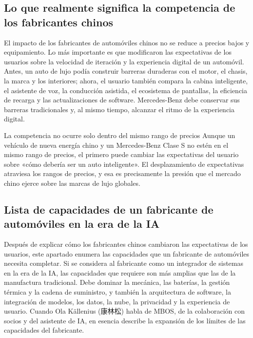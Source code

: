 \documentclass[a4paper]{article}
\begin{document}
\subsection{Lo que realmente significa la competencia de los fabricantes chinos}

El impacto de los fabricantes de automóviles chinos no se reduce a precios bajos y equipamiento. Lo más importante es que modificaron las expectativas de los usuarios sobre la velocidad de iteración y la experiencia digital de un automóvil. Antes, un auto de lujo podía construir barreras duraderas con el motor, el chasis, la marca y los interiores; ahora, el usuario también compara la cabina inteligente, el asistente de voz, la conducción asistida, el ecosistema de pantallas, la eficiencia de recarga y las actualizaciones de software. Mercedes-Benz debe conservar sus barreras tradicionales y, al mismo tiempo, alcanzar el ritmo de la experiencia digital.

\begin{warningbox}{La competencia no ocurre solo dentro del mismo rango de precios}
Aunque un vehículo de nueva energía chino y un Mercedes-Benz Clase S no estén en el mismo rango de precios, el primero puede cambiar las expectativas del usuario sobre «cómo debería ser un auto inteligente». El desplazamiento de expectativas atraviesa los rangos de precios, y esa es precisamente la presión que el mercado chino ejerce sobre las marcas de lujo globales.
\end{warningbox}

\subsection{Lista de capacidades de un fabricante de automóviles en la era de la IA}

Después de explicar cómo los fabricantes chinos cambiaron las expectativas de los usuarios, este apartado enumera las capacidades que un fabricante de automóviles necesita completar. Si se considera al fabricante como un integrador de sistemas en la era de la IA, las capacidades que requiere son más amplias que las de la manufactura tradicional. Debe dominar la mecánica, las baterías, la gestión térmica y la cadena de suministro, y también la arquitectura de software, la integración de modelos, los datos, la nube, la privacidad y la experiencia de usuario. Cuando Ola Källenius (康林松) habla de MBOS, de la colaboración con socios y del asistente de IA, en esencia describe la expansión de los límites de las capacidades del fabricante.
\end{document}

